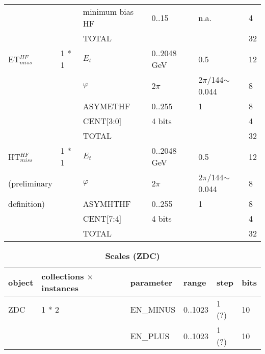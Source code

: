 \documentclass{cmspaper}
\begin{document}
\begin{table}[ht]
\begin{tabular}{| l | l | l | l | l | l |}
    &       &   minimum bias HF &      0..15    &   n.a.    &   4                    \\
    &       &   TOTAL   &       &       &   32                    \\
\hline
ET$_{miss}^{HF}$	&	1 * 1	&   $E_t$   &   0..2048 GeV &   0.5 &   12                    \\
	&		&   $\varphi$   &   2$\pi$  &   2$\pi$/144$\sim$0.044   &   8                    \\
    &       &   ASYMETHF    &  0..255     &    1   &   8                    \\
    &       &   CENT[3:0]    &  4 bits    &       &   4                    \\
	&		&	TOTAL	&		&		&	32                    \\
\hline
HT$_{miss}^{HF}$	&	1 * 1	&   $E_t$   &   0..2048 GeV &   0.5 &   12                    \\
(preliminary	&		&   $\varphi$   &   2$\pi$  &   2$\pi$/144$\sim$0.044   &   8                    \\
definition)	&		&	ASYMHTHF	&	0..255 &	1 &	8                    \\
    &       &   CENT[7:4]    & 4 bits     &       &   4                    \\
	&		&	TOTAL	&		&		&	32                    \\
\hline
\end{tabular}
\label{table:scales_table_2}
\end{table}

\begin{table}[ht]
\caption{\bf Scales (ZDC)}
\vspace{5mm}
\centering
\begin{tabular}{|p{2.0cm}| l | p{2.0cm} | p{2.0cm} | p{2.0cm} | l |}
\hline
object	&	collections $\times$ instances	&	parameter	&	range	&	step	&	bits \\
\hline\hline
ZDC	       &	1 * 2	& EN\_MINUS	    &	0..1023	   &	1 (?)	  &	10  \\
           &	        & EN\_PLUS	    &	0..1023	   &	1 (?)	  &	10  \\
\hline
\end{tabular}
\label{table:scales_table_3}
\end{table}
\end{document}
